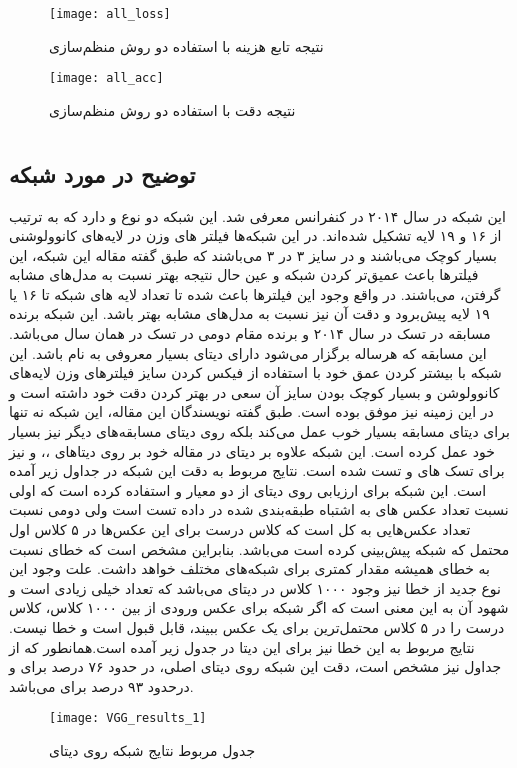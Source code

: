\documentclass{article}
\begin{document}
\begin{figure}[H]
	\centerline{\texttt{[image: all\_loss]}}
	\caption{نتیجه تابع هزینه با استفاده دو روش منظم‌سازی}
\end{figure}
\begin{figure}[H]
	\centerline{\texttt{[image: all\_acc]}}
	\caption{نتیجه دقت با استفاده دو روش منظم‌سازی}
\end{figure}

\section{}
\subsection{توضیح در مورد شبکه }
این شبکه در سال ۲۰۱۴ در کنفرانس  معرفی شد. این شبکه دو نوع  و  دارد که به ترتیب از ۱۶ و ۱۹ لایه تشکیل شده‌اند. در این شبکه‌ها فیلتر های وزن در لایه‌های کانوولوشنی بسیار کوچک می‌باشند و در سایز ۳ در ۳ می‌باشند که طبق گفته مقاله این شبکه، این فیلتر‌ها باعث عمیق‌تر کردن شبکه و عین حال نتیجه بهتر نسبت به مدل‌های مشابه گرفتن‌، می‌باشند. در واقع وجود این فیلتر‌ها باعث شده تا تعداد لایه ‌های شبکه تا ۱۶ یا ۱۹ لایه پیش‌برود و دقت آن نیز نسبت به مدل‌های مشابه بهتر باشد. این شبکه  برنده مسابقه  در تسک  در سال ۲۰۱۴ و برنده مقام دومی در تسک  در همان سال می‌باشد. این مسابقه که هرساله برگزار می‌شود دارای دیتای بسیار معروفی به نام  باشد. این شبکه با بیشتر کردن عمق‌ خود با استفاده از فیکس کردن سایز فیلتر‌های وزن لایه‌های کانوولوشن و بسیار کوچک بودن سایز آن سعی در بهتر کردن دقت خود داشته است و در این زمینه نیز موفق بوده است. طبق گفته نویسندگان این مقاله، این شبکه نه تنها برای دیتای مسابقه  بسیار خوب عمل می‌کند بلکه روی دیتای مسابقه‌های دیگر نیز بسیار خود عمل کرده است. این شبکه علاوه بر دیتای  در مقاله‌ خود بر روی دیتاهای ،،  و  نیز برای تسک های  و  تست شده است.  نتایج مربوط به دقت این شبکه در جداول زیر آمده است. این شبکه برای ارزیابی روی دیتای  از دو معیار  و  استفاده کرده است که اولی نسبت تعداد عکس های به اشتباه طبقه‌بندی شده در داده تست است ولی دومی نسبت تعداد عکس‌هایی به کل است که کلاس درست برای این عکس‌ها در ۵ کلاس اول محتمل که شبکه پیش‌بینی کرده است می‌باشد. بنابراین مشخص است که خطای  نسبت به خطای  همیشه مقدار کمتری برای شبکه‌های مختلف خواهد داشت. علت وجود این نوع جدید از خطا نیز وجود ۱۰۰۰ کلاس در دیتای  می‌باشد که تعداد خیلی زیادی است و شهود آن به این معنی است که اگر شبکه برای عکس ورودی از بین ۱۰۰۰ کلاس، کلاس درست را در ۵ کلاس محتمل‌ترین برای یک عکس ببیند، قابل قبول است و خطا نیست. نتایج مربوط به این خطا نیز برای این دیتا در جدول زیر آمده است.همانطور که از جداول نیز مشخص است، دقت این شبکه روی دیتای اصلی، در حدود ۷۶ درصد برای  و درحدود ۹۳ درصد برای  می‌باشد.
‌\begin{figure}[H]
	\centerline{\texttt{[image: VGG\_results\_1]}}
	\caption{جدول مربوط نتایج شبکه  روی دیتای }
\end{figure}
\end{document}
